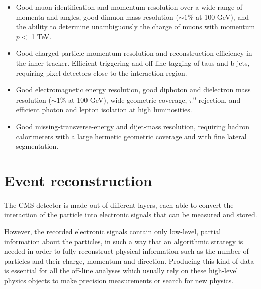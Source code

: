 \documentclass[a4paper, 10pt, openright]{report}
\begin{document}
\begin{itemize}
\item Good muon identification and momentum resolution over a wide range of momenta and angles, good dimuon mass resolution ($\sim 1$\% at 100 GeV), and the ability to determine unambiguously the charge of muons with momentum $p <$ 1 TeV.
\item Good charged-particle momentum resolution and reconstruction efficiency in the inner tracker. Efficient triggering and off-line tagging of taus and b-jets, requiring pixel detectors close to the interaction region.
\item Good electromagnetic energy resolution, good diphoton and dielectron mass resolution ($\sim 1$\% at 100 GeV), wide geometric coverage, $\pi^0$ rejection, and efficient photon and lepton isolation at high luminosities.
\item Good missing-transverse-energy and dijet-mass resolution, requiring hadron calorimeters with a large hermetic geometric coverage and with fine lateral segmentation.
\end{itemize}




























\chapter{Event reconstruction} \label{chapter:Reco}

The \ac{CMS} detector is made out of different layers, each able to convert the interaction of the particle into electronic signals that can be measured and stored. 

However, the recorded electronic signals contain only low-level, partial information about the particles, in such a way that an algorithmic strategy is needed in order to fully reconstruct physical information such as the number of particles and their charge, momentum and direction. Producing this kind of data is essential for all the off-line analyses which usually rely on these high-level physics objects to make precision measurements or search for new physics. 
\end{document}
